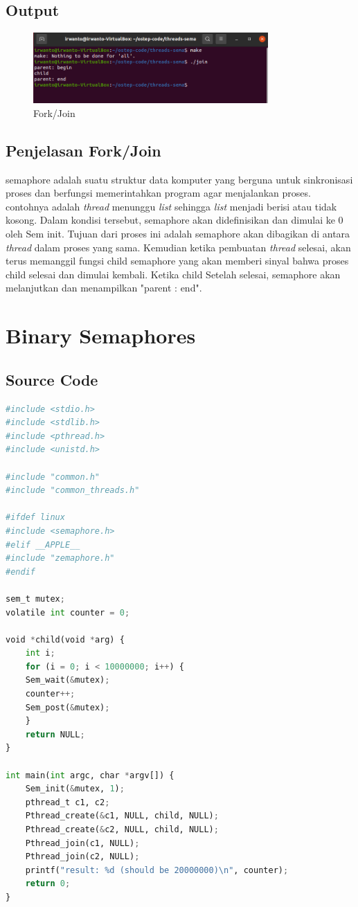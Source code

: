 \documentclass[11pt,a4paper]{article}
\begin{document}
\subsection{Output}
\begin{figure}[h]
    \centering
    \includegraphics[width=0.8\textwidth]{Figure/join.png}
    \caption{Fork/Join}
    \label{fig:my_label}
\end{figure}

\subsection{Penjelasan Fork/Join}
semaphore adalah suatu struktur data komputer yang berguna untuk sinkronisasi proses dan berfungsi memerintahkan program agar menjalankan proses. contohnya adalah \textit{thread} menunggu \textit{list} sehingga \textit{list} menjadi berisi atau tidak kosong. Dalam kondisi tersebut, semaphore akan didefinisikan dan dimulai ke 0 oleh Sem init. Tujuan dari proses ini adalah semaphore akan dibagikan di antara \textit{thread} dalam proses yang sama. Kemudian ketika pembuatan \textit{thread} selesai, akan terus memanggil fungsi child semaphore yang akan memberi sinyal bahwa proses child selesai dan dimulai kembali. Ketika child Setelah selesai, semaphore akan melanjutkan dan menampilkan "parent : end".

\section{Binary Semaphores}
\subsection{Source Code}
\begin{lstlisting}[language=Python, caption=Code Binary semaphores,label={labelkode}]
#include <stdio.h>
#include <stdlib.h>
#include <pthread.h>
#include <unistd.h>

#include "common.h"
#include "common_threads.h"

#ifdef linux
#include <semaphore.h>
#elif __APPLE__
#include "zemaphore.h"
#endif

sem_t mutex;
volatile int counter = 0;

void *child(void *arg) {
    int i;
    for (i = 0; i < 10000000; i++) {
	Sem_wait(&mutex);
	counter++;
	Sem_post(&mutex);
    }
    return NULL;
}

int main(int argc, char *argv[]) {
    Sem_init(&mutex, 1); 
    pthread_t c1, c2;
    Pthread_create(&c1, NULL, child, NULL);
    Pthread_create(&c2, NULL, child, NULL);
    Pthread_join(c1, NULL);
    Pthread_join(c2, NULL);
    printf("result: %d (should be 20000000)\n", counter);
    return 0;
}
    \end{lstlisting}
\end{document}

